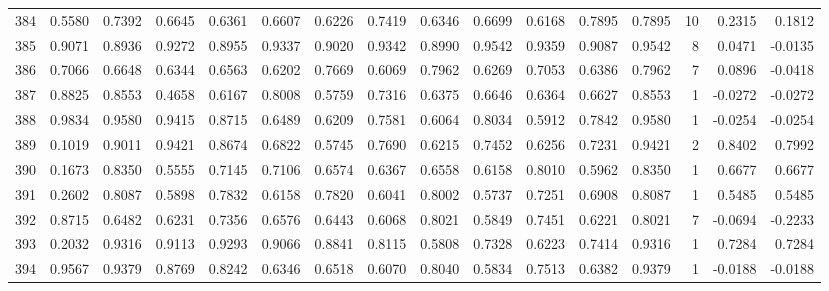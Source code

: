 \begin{tabular}{lrrrrrrrrrrrrrrr}
384 &      0.5580 &  0.7392 &  0.6645 &  0.6361 &  0.6607 &  0.6226 &  0.7419 &  0.6346 &  0.6699 &  0.6168 &   0.7895 &     0.7895 &     10 &                    0.2315 &                     0.1812 \\
385 &      0.9071 &  0.8936 &  0.9272 &  0.8955 &  0.9337 &  0.9020 &  0.9342 &  0.8990 &  0.9542 &  0.9359 &   0.9087 &     0.9542 &      8 &                    0.0471 &                    -0.0135 \\
386 &      0.7066 &  0.6648 &  0.6344 &  0.6563 &  0.6202 &  0.7669 &  0.6069 &  0.7962 &  0.6269 &  0.7053 &   0.6386 &     0.7962 &      7 &                    0.0896 &                    -0.0418 \\
387 &      0.8825 &  0.8553 &  0.4658 &  0.6167 &  0.8008 &  0.5759 &  0.7316 &  0.6375 &  0.6646 &  0.6364 &   0.6627 &     0.8553 &      1 &                   -0.0272 &                    -0.0272 \\
388 &      0.9834 &  0.9580 &  0.9415 &  0.8715 &  0.6489 &  0.6209 &  0.7581 &  0.6064 &  0.8034 &  0.5912 &   0.7842 &     0.9580 &      1 &                   -0.0254 &                    -0.0254 \\
389 &      0.1019 &  0.9011 &  0.9421 &  0.8674 &  0.6822 &  0.5745 &  0.7690 &  0.6215 &  0.7452 &  0.6256 &   0.7231 &     0.9421 &      2 &                    0.8402 &                     0.7992 \\
390 &      0.1673 &  0.8350 &  0.5555 &  0.7145 &  0.7106 &  0.6574 &  0.6367 &  0.6558 &  0.6158 &  0.8010 &   0.5962 &     0.8350 &      1 &                    0.6677 &                     0.6677 \\
391 &      0.2602 &  0.8087 &  0.5898 &  0.7832 &  0.6158 &  0.7820 &  0.6041 &  0.8002 &  0.5737 &  0.7251 &   0.6908 &     0.8087 &      1 &                    0.5485 &                     0.5485 \\
392 &      0.8715 &  0.6482 &  0.6231 &  0.7356 &  0.6576 &  0.6443 &  0.6068 &  0.8021 &  0.5849 &  0.7451 &   0.6221 &     0.8021 &      7 &                   -0.0694 &                    -0.2233 \\
393 &      0.2032 &  0.9316 &  0.9113 &  0.9293 &  0.9066 &  0.8841 &  0.8115 &  0.5808 &  0.7328 &  0.6223 &   0.7414 &     0.9316 &      1 &                    0.7284 &                     0.7284 \\
394 &      0.9567 &  0.9379 &  0.8769 &  0.8242 &  0.6346 &  0.6518 &  0.6070 &  0.8040 &  0.5834 &  0.7513 &   0.6382 &     0.9379 &      1 &                   -0.0188 &                    -0.0188 \\

\end{tabular}
